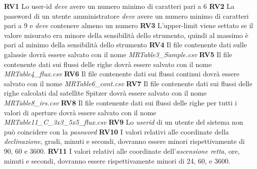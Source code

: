 \documentclass[12pt,a4paper,onecolumn,x11names]{article}
\begin{document}
		\begin{flushleft}
			\textbf{RV1} Lo user-id \textit{deve} avere un numero minimo di caratteri pari a 6\newline
			\textbf{RV2} La password di un utente amministratore \textit{deve} avere un numero minimo di caratteri pari a 9 e \textit{deve} contenere almeno un numero\newline
			\textbf{RV3} L'upper-limit viene settato se il valore misurato era minore della sensibilità dello strumento, quindi al massimo è pari al minimo della sensibilità dello strumento\newline
			\textbf{RV4} Il file contenente dati sulle galassie dovrà essere salvato con il nome \textit{MRTable3\_Sample.csv}\newline
			\textbf{RV5} Il file contenente dati sui flussi delle righe dovrà essere salvato con il nome \textit{MRTable4\_flux.csv}\newline
			\textbf{RV6} Il file contenente dati sui flussi continui dovrà essere salvato con il nome \textit{MRTable6\_cont.csv}\newline
			\textbf{RV7} Il file contenente dati sui flussi delle righe calcolati dal satellite Spitzer dovrà essere salvato con il nome \textit{MRTable8\_irs.csv}\newline
			\textbf{RV8} Il file contenente dati sui flussi delle righe per tutti i valori di aperture dovrà essere salvato con il nome \textit{MRTable11\_C\_3x3\_5x5\_flux.csv}\newline
			\textbf{RV9} Lo \textit{userid} di un utente del sistema non può coincidere con la \textit{password}\newline
			\textbf{RV10} I valori relativi alle coordinate della \textit{declinazione}, gradi, minuti e secondi, dovranno essere minori rispettivamente di 90, 60 e 3600.\newline
			\textbf{RV11} I valori relativi alle coordinate dell'\textit{ascensione retta}, ore, minuti e secondi, dovranno essere rispettivamente minori di 24, 60, e 3600. 
		\end{flushleft}
\end{document}
